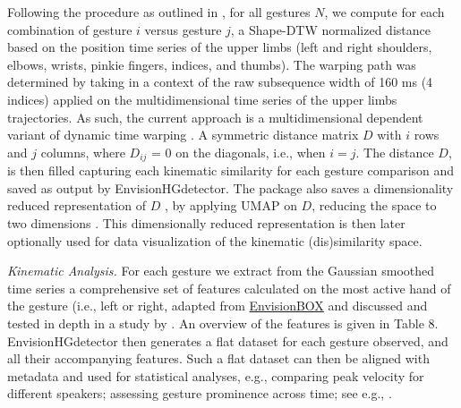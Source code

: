 \documentclass[11pt,headings=small,cleardoublepage=empty,tocflat,numbers=noenddot,twoside,captions=tableheading]{scrbook}
\begin{document}
\begin{refsection}
\begin{table}[H]
\begin{table}[H]
\begin{table}[H]
Following the procedure as outlined in \citet{pouwGestureNetworksIntroducing2019}, for all gestures \( N \), we compute for each combination of gesture \( i \) versus gesture \( j \), a Shape-DTW normalized distance based on the position time series of the upper limbs (left and right shoulders, elbows, wrists, pinkie fingers, indices, and thumbs). The warping path was determined by taking in a context of the raw subsequence width of 160 ms (4 indices) applied on the multidimensional time series of the upper limbs trajectories. As such, the current approach is a multidimensional dependent variant of dynamic time warping \parencite{giorginoComputingVisualizingDynamic2009}. A symmetric distance matrix \( D \) with \( i \) rows and \( j \) columns, where \( D_{ij} \) = 0 on the diagonals, i.e., when \( i = j \). The distance \( D \), is then filled capturing each kinematic similarity for each gesture comparison and saved as output by EnvisionHGdetector. The package also saves a dimensionality reduced representation of  \( D \) , by applying UMAP on \( D \), reducing the space to two dimensions \parencite{mcinnesUMAPUniformManifold2020}. This dimensionally reduced representation is then later optionally used for data visualization of the kinematic (dis)similarity space.

\emph{Kinematic Analysis.} 
For each gesture we extract from the Gaussian smoothed time series a comprehensive set of features calculated on the most active hand of the gesture (i.e., left or right, adapted from \href{https://envisionbox.org/embedded_Analysis_kinematic_features_module.html}{EnvisionBOX} and discussed and tested in depth in a study by  \citet{trujilloMarkerlessAutomaticAnalysis2019}. An overview of the features is given in Table 8. EnvisionHGdetector then generates a flat dataset for each gesture observed, and all their accompanying features. Such a flat dataset can then be aligned with metadata and used for statistical analyses, e.g., comparing peak velocity for different speakers; assessing gesture prominence across time; see e.g., \citet{rasenbergMultimodalNatureCommunicative2022, pouwSystematicInvestigationGesture2021, trujilloCommunicativeIntentModulates2018}. 


\end{table}
\end{table}
\end{table}
\end{refsection}
\end{document}
